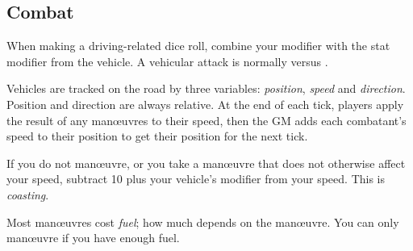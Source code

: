 
\subsection{Combat}
When making a driving-related dice roll, combine your  modifier with the stat modifier from the vehicle. A vehicular attack is normally  versus .

Vehicles are tracked on the road by three variables: \emph{position}, \emph{speed} and \emph{direction}. Position and direction are always relative. At the end of each tick, players apply the result of any man\oe{}uvres to their speed, then the GM adds each combatant's speed to their position to get their position for the next tick.

If you do not man\oe{}uvre, or you take a man\oe{}uvre that does not otherwise affect your speed, subtract 10 plus your vehicle's  modifier from your speed. This is \emph{coasting}.

Most man\oe{}uvres cost \emph{fuel}; how much depends on the man\oe{}uvre. You can only man\oe{}uvre if you have enough fuel.
